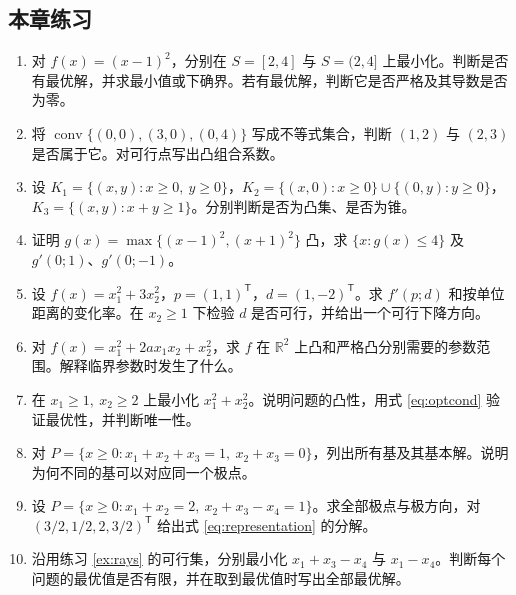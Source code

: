 \documentclass[UTF8,fontset=none,zihao=-4,a4paper]{ctexart}
\newcommand{\R}{\mathbb{R}}
\newcommand{\transpose}{^{\mathsf T}}
\newcommand{\conv}{\operatorname{conv}}
\begin{document}
\subsection{本章练习}
\begin{enumerate}[label=2.\arabic*.,ref=2.\arabic*,leftmargin=3em]
\item\label{ex:local} 对 $f(x)=(x-1)^2$，分别在 $S=[2,4]$ 与 $S=(2,4]$ 上最小化。判断是否有最优解，并求最小值或下确界。若有最优解，判断它是否严格及其导数是否为零。
\item\label{ex:hull} 将 $\conv\{(0,0),(3,0),(0,4)\}$ 写成不等式集合，判断 $(1,2)$ 与 $(2,3)$ 是否属于它。对可行点写出凸组合系数。
\item\label{ex:cone} 设 $K_1=\{(x,y):x\ge0,\ y\ge0\}$，$K_2=\{(x,0):x\ge0\}\cup\{(0,y):y\ge0\}$，$K_3=\{(x,y):x+y\ge1\}$。分别判断是否为凸集、是否为锥。
\item\label{ex:sublevel} 证明 $g(x)=\max\{(x-1)^2,(x+1)^2\}$ 凸，求 $\{x:g(x)\le4\}$ 及 $g'(0;1)$、$g'(0;-1)$。
\item\label{ex:dir} 设 $f(x)=x_1^2+3x_2^2$，$p=(1,1)\transpose$，$d=(1,-2)\transpose$。求 $f'(p;d)$ 和按单位距离的变化率。在 $x_2\ge1$ 下检验 $d$ 是否可行，并给出一个可行下降方向。
\item\label{ex:hess} 对 $f(x)=x_1^2+2a x_1x_2+x_2^2$，求 $f$ 在 $\R^2$ 上凸和严格凸分别需要的参数范围。解释临界参数时发生了什么。
\item\label{ex:optcond} 在 $x_1\ge1,\ x_2\ge2$ 上最小化 $x_1^2+x_2^2$。说明问题的凸性，用式 \eqref{eq:optcond} 验证最优性，并判断唯一性。
\item\label{ex:degenerate} 对 $P=\{x\ge0:x_1+x_2+x_3=1,\ x_2+x_3=0\}$，列出所有基及其基本解。说明为何不同的基可以对应同一个极点。
\item\label{ex:rays} 设 $P=\{x\ge0:x_1+x_2=2,\ x_2+x_3-x_4=1\}$。求全部极点与极方向，对 $(3/2,1/2,2,3/2)\transpose$ 给出式 \eqref{eq:representation} 的分解。
\item\label{ex:unbounded} 沿用练习 \ref{ex:rays} 的可行集，分别最小化 $x_1+x_3-x_4$ 与 $x_1-x_4$。判断每个问题的最优值是否有限，并在取到最优值时写出全部最优解。
\end{enumerate}
\end{document}
